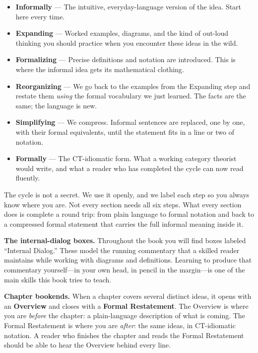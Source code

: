 \medskip
\begin{itemize}
  \item \textbf{Informally} ---
    The intuitive, everyday-language version of the idea. Start here every
    time.

  \item \textbf{Expanding} ---
    Worked examples, diagrams, and the kind of out-loud thinking you should
    practice when you encounter these ideas in the wild.

  \item \textbf{Formalizing} ---
    Precise definitions and notation are introduced. This is where the
    informal idea gets its mathematical clothing.

  \item \textbf{Reorganizing} ---
    We go back to the examples from the Expanding step and restate them
    \emph{using} the formal vocabulary we just learned. The facts are the
    same; the language is new.

  \item \textbf{Simplifying} ---
    We compress. Informal sentences are replaced, one by one, with their
    formal equivalents, until the statement fits in a line or two of notation.

  \item \textbf{Formally} ---
    The CT-idiomatic form. What a working category theorist would write, and
    what a reader who has completed the cycle can now read fluently.
\end{itemize}
\medskip

The cycle is not a secret. We use it openly, and we label each step so you
always know where you are. Not every section needs all six steps. What every
section does is complete a round trip: from plain language to formal notation
and back to a compressed formal statement that carries the full informal
meaning inside it.

\bigskip

\textbf{The internal-dialog boxes.} Throughout the book you will find boxes
labeled ``Internal Dialog.'' These model the running commentary that a skilled
reader maintains while working with diagrams and definitions. Learning to
produce that commentary yourself---in your own head, in pencil in the
margin---is one of the main skills this book tries to teach.

\bigskip

\textbf{Chapter bookends.} When a chapter covers several distinct ideas, it
opens with an \textbf{Overview} and closes with a \textbf{Formal Restatement}.
The Overview is where you are \emph{before} the chapter: a plain-language
description of what is coming. The Formal Restatement is where you are
\emph{after}: the same ideas, in CT-idiomatic notation. A reader who finishes
the chapter and reads the Formal Restatement should be able to hear the
Overview behind every line.

